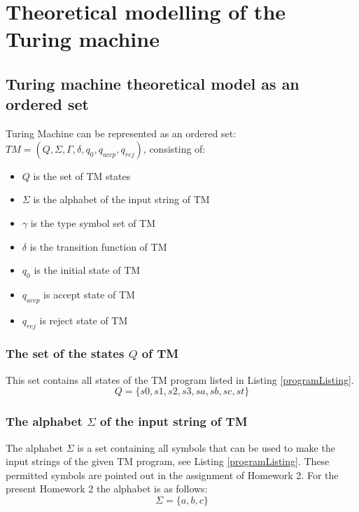 \documentclass[12pt, a4paper, bibliography=totocnumbered]{report}
\begin{document}

\chapter{Theoretical modelling of the Turing machine}


\section[]{Turing machine theoretical model as an ordered set}

Turing Machine can be represented as an ordered set: $ TM = (Q, \Sigma, \Gamma, \delta, q_{0}, q_{accp}, q_{rej}) $, consisting of: 
			\begin{itemize}
				\item $Q$  is the set of TM states
				\item $\Sigma$  is the alphabet of the input string of TM
				\item $\gamma$  is the type symbol set of TM
				\item $\delta$  is the transition function of TM
				\item $q_{0}$ is the initial state of TM
				\item $q_{accp}$ is accept state of TM
				\item $q_{rej}$  is reject state of TM
				\end{itemize}


	\subsection{The set of the states $Q$ of TM}
	This set contains all states of the TM program listed in Listing \ref{programListing}.
		\begin{equation}\label{eq:Q}
			Q = \{s0, s1, s2, s3, sa, sb, sc, st\}
		\end{equation}
	\subsection{The alphabet $ \Sigma $ of the input string of TM}
		The alphabet $ \Sigma $ is a set containing all symbols that can be used to make the input strings of the given TM program, see Listing \ref{programListing}. These permitted symbols are pointed out in the assignment of Homework 2. For the present Homework 2 the alphabet is as follows:
		\begin{equation}
			\Sigma = \{a, b, c\}
		\end{equation}
% 
\end{document}
